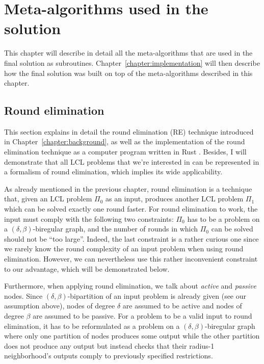 \chapter{Meta-algorithms used in the solution}
\label{chapter:environment}

This chapter will describe in detail all the meta-algorithms that are
used in the final solution as subroutines.
Chapter~\ref{chapter:implementation} will then
describe how the final solution was built on top of the meta-algorithms
described in this chapter.

\section{Round elimination}

This section explains in detail the round elimination (RE)
technique introduced in Chapter~\ref{chapter:background}, as well as
the implementation of the round elimination technique as a computer
program written in Rust \cite{Brandt2019, Olivetti2020}.
Besides, I will demonstrate that all LCL problems that
we're interested in can be represented in a formalism
of round elimination, which implies
its wide applicability.

As already mentioned in the previous chapter, round elimination
is a technique that, given an LCL problem $\Pi_0$ as an input, produces
another LCL problem $\Pi_1$ which can be solved exactly one round
faster. For round elimination to work, the input must comply
with the following two constraints: $\Pi_0$ has to be a problem on a $(\delta, \beta)$-biregular
graph, and the number of rounds in which $\Pi_0$ can be solved
should not be ``too large''. Indeed, the last constraint is a rather curious one
since we rarely know the round complexity of an input problem when using
round elimination. However, we can nevertheless use this rather inconvenient constraint
to our advantage, which will be demonstrated below.

Furthermore, when applying round elimination, we talk about \emph{active} and
\emph{passive} nodes. Since $(\delta, \beta)$-bipartition of an input problem is
already given (see our assumption above), nodes of degree $\delta$ are assumed
to be active and nodes of degree $\beta$ are assumed to be passive. For a problem
to be a valid input to round elimination, it has to be reformulated as a problem on
a $(\delta, \beta)$-biregular graph where only one partition of nodes produces
some output while the other partition does not produce any output but instead
checks that their radius-1 neighborhood's outputs comply to previously
specified restrictions.

